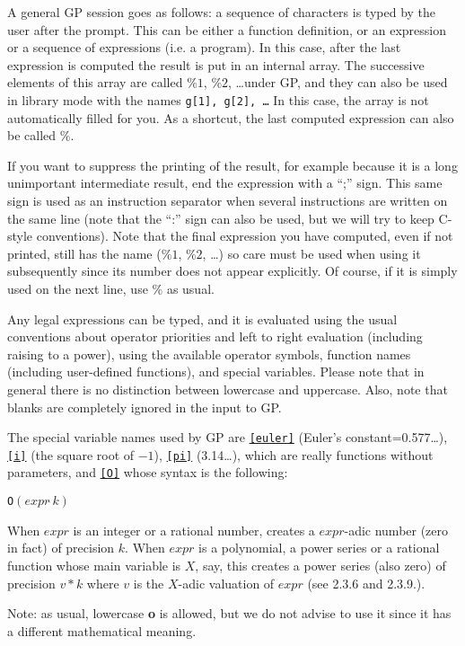A general GP session goes as follows: a sequence of characters is typed by the
user after the prompt. This can be either a function definition, or an
expression or a sequence of expressions (i.e. a program). In this case, after
the last expression is computed the result is
put in an internal array. The successive elements of this array are called
$\%1$, $\%2$, \dots under GP, and they can also be used in library mode with the names 
{\tt g[1], g[2], \dots} In this case, the array is not automatically filled for you.
As a shortcut, the last computed expression can also be called $\%$.

If you want to suppress the printing of the result, for example because it is
a long unimportant intermediate result, end the expression with a ``;'' sign.
This same sign is used as an instruction separator when several instructions
are written on the same line (note that the ``:'' sign can also be used, but
we will try to keep C-style conventions).
Note that the final expression you have computed, even if not printed,
still has the name ($\%1$, $\%2$, \dots) so care must be used when using it
subsequently since its number does not appear explicitly. Of course, if it
is simply used on the next line, use $\%$ as usual.

Any legal expressions can be typed, and it is evaluated using the usual
conventions about operator priorities and left to right evaluation
(including raising to a power), using the available operator
symbols, function names (including user-defined functions), and special
variables. Please note that in general there
is no distinction between lowercase and uppercase.
Also, note that blanks are completely ignored in the input to GP.

The special variable names used by GP are {\tt \ref{euler}} (Euler's
constant=0.577\dots), {\tt \ref{i}} (the square root of $-1$),
{\tt \ref{pi}} (3.14\dots), which are really functions without parameters, and {\tt \ref{O}} whose syntax is the following:

{\tt O}$(expr\hat{\ }k)$

When $expr$ is an integer or a
rational number, creates a $expr$-adic number (zero in fact) of precision $k$.
When $expr$ is a polynomial, a power series or a rational function whose main
variable is $X$, say, this creates
a power series (also zero) of precision $v*k$ where $v$ is the
$X$-adic valuation of $expr$ (see 2.3.6 and 2.3.9.).

Note: as usual, lowercase {\bf o} is allowed, but we do not
advise to use it since it has a different mathematical meaning.


\vfill\eject



